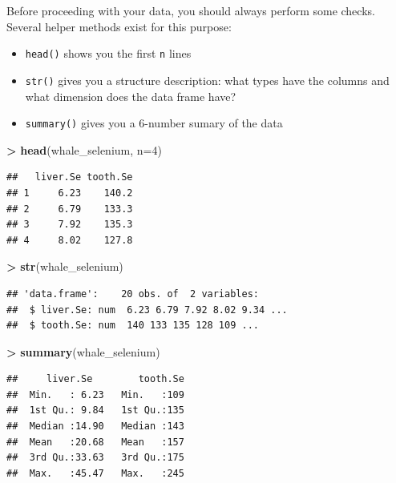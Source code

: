 \documentclass[]{book}
\newenvironment{Shaded}{\begin{snugshade}}{\end{snugshade}}
\newcommand{\DataTypeTok}[1]{\textcolor[rgb]{0.13,0.29,0.53}{#1}}
\newcommand{\DecValTok}[1]{\textcolor[rgb]{0.00,0.00,0.81}{#1}}
\newcommand{\KeywordTok}[1]{\textcolor[rgb]{0.13,0.29,0.53}{\textbf{#1}}}
\newcommand{\NormalTok}[1]{#1}
\newcommand{\OperatorTok}[1]{\textcolor[rgb]{0.81,0.36,0.00}{\textbf{#1}}}
\newcommand{\StringTok}[1]{\textcolor[rgb]{0.31,0.60,0.02}{#1}}
\providecommand{\tightlist}{%
  \setlength{\itemsep}{0pt}\setlength{\parskip}{0pt}}
\begin{document}
Before proceeding with your data, you should always perform some checks. Several helper methods exist for this purpose:

\begin{itemize}
\tightlist
\item
  \texttt{head()} shows you the first \texttt{n} lines
\item
  \texttt{str()} gives you a structure description: what types have the columns and what dimension does the data frame have?
\item
  \texttt{summary()} gives you a 6-number sumary of the data
\end{itemize}

\begin{Shaded}
\begin{Highlighting}[]
\OperatorTok{>}\StringTok{ }\KeywordTok{head}\NormalTok{(whale_selenium, }\DataTypeTok{n=}\DecValTok{4}\NormalTok{) }
\end{Highlighting}
\end{Shaded}

\begin{verbatim}
##   liver.Se tooth.Se
## 1     6.23    140.2
## 2     6.79    133.3
## 3     7.92    135.3
## 4     8.02    127.8
\end{verbatim}

\begin{Shaded}
\begin{Highlighting}[]
\OperatorTok{>}\StringTok{ }\KeywordTok{str}\NormalTok{(whale_selenium) }
\end{Highlighting}
\end{Shaded}

\begin{verbatim}
## 'data.frame':    20 obs. of  2 variables:
##  $ liver.Se: num  6.23 6.79 7.92 8.02 9.34 ...
##  $ tooth.Se: num  140 133 135 128 109 ...
\end{verbatim}

\begin{Shaded}
\begin{Highlighting}[]
\OperatorTok{>}\StringTok{ }\KeywordTok{summary}\NormalTok{(whale_selenium) }
\end{Highlighting}
\end{Shaded}

\begin{verbatim}
##     liver.Se        tooth.Se  
##  Min.   : 6.23   Min.   :109  
##  1st Qu.: 9.84   1st Qu.:135  
##  Median :14.90   Median :143  
##  Mean   :20.68   Mean   :157  
##  3rd Qu.:33.63   3rd Qu.:175  
##  Max.   :45.47   Max.   :245
\end{verbatim}
\end{document}
